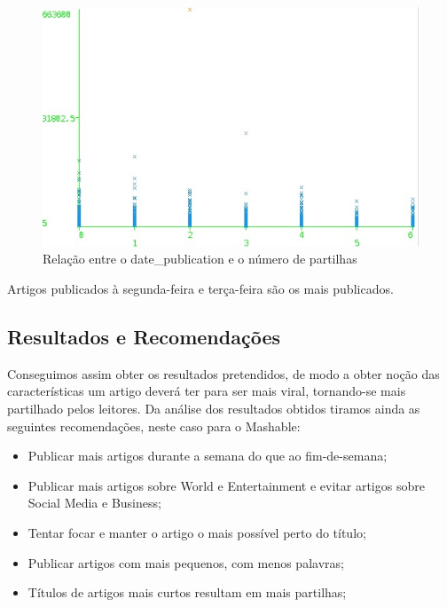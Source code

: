 \begin{figure}[H]
    \centering
    \includegraphics[scale=0.6]{tex/img/graph8.jpg}
    \caption{Relação entre o date\_publication e o número de partilhas}
    \label{fig:datePublication}
\end{figure}

Artigos publicados à segunda-feira e terça-feira são os mais publicados.


\subsection{Resultados e Recomendações}


Conseguimos assim obter os resultados pretendidos, de modo a obter noção das características um artigo deverá ter para ser mais viral, tornando-se mais partilhado pelos leitores. Da análise dos resultados obtidos tiramos ainda as seguintes recomendações, neste caso para o Mashable:

\begin{itemize}
  \item Publicar mais artigos durante a semana do que ao fim-de-semana;
  \item Publicar mais artigos sobre World e Entertainment e evitar artigos sobre Social Media e Business;
  \item Tentar focar e manter o artigo o mais possível perto do título;
  \item Publicar artigos com mais pequenos, com menos palavras;
  \item Títulos de artigos mais curtos resultam em mais partilhas;
\end{itemize}